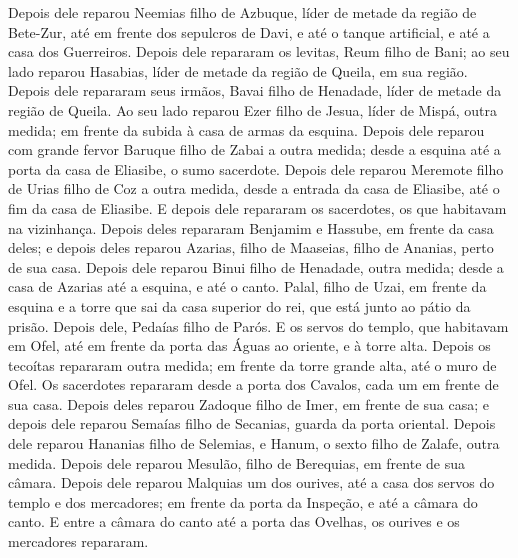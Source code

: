{  Depois dele reparou Neemias filho de Azbuque, líder de metade da região de Bete-Zur, até em frente dos sepulcros de Davi, e até o tanque artificial, e até a casa dos Guerreiros.
  Depois dele repararam os levitas, Reum filho de Bani; ao seu lado reparou Hasabias, líder de metade da região de Queila, em sua região.
  Depois dele repararam seus irmãos, Bavai filho de Henadade, líder de metade da região de Queila.
  Ao seu lado reparou Ezer filho de Jesua, líder de Mispá, outra medida; em frente da subida à casa de armas da esquina.
  Depois dele reparou com grande fervor Baruque filho de Zabai a outra medida; desde a esquina até a porta da casa de Eliasibe, o sumo sacerdote.
  Depois dele reparou Meremote filho de Urias filho de Coz a outra medida, desde a entrada da casa de Eliasibe, até o fim da casa de Eliasibe.
  E depois dele repararam os sacerdotes, os que habitavam na vizinhança.
  Depois deles repararam Benjamim e Hassube, em frente da casa deles; e depois deles reparou Azarias, filho de Maaseias, filho de Ananias, perto de sua casa.
  Depois dele reparou Binui filho de Henadade, outra medida; desde a casa de Azarias até a esquina, e até o canto.
  Palal, filho de Uzai, em frente da esquina e a torre que sai da casa superior do rei, que está junto ao pátio da prisão. Depois dele, Pedaías filho de Parós.
  E os servos do templo, que habitavam em Ofel, {} até em frente da porta das Águas ao oriente, e à torre alta.
  Depois os tecoítas repararam outra medida; em frente da torre grande {} alta, até o muro de Ofel.
  Os sacerdotes repararam desde a porta dos Cavalos, cada um em frente de sua casa.
  Depois deles reparou Zadoque filho de Imer, em frente de sua casa; e depois dele reparou Semaías filho de Secanias, guarda da porta oriental.
  Depois dele reparou Hananias filho de Selemias, e Hanum, o sexto filho de Zalafe, outra medida. Depois dele reparou Mesulão, filho de Berequias, em frente de sua câmara.
  Depois dele reparou Malquias um dos ourives, até a casa dos servos do templo e dos mercadores; em frente da porta da Inspeção, e até a câmara do canto.
  E entre a câmara do canto até a porta das Ovelhas, os ourives e os mercadores repararam.
\par }

